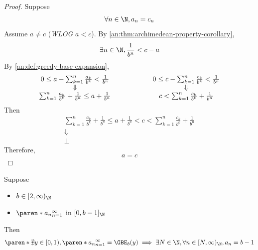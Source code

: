 \begin{proof}
  Suppose
  \[
    \forall n \in \N, a_{n} = c_{n}
  \]
  Assume $a \neq c$ (\emph{WLOG} $a < c$). By \cref{an:thm:archimedean-property-corollary},
  \[
    \exists n \in \N, \frac{1}{b^{n}} < c - a
  \]
  By \cref{an:def:greedy-base-expansion},
  \[
    \begin{array}{c@{\qquad\qquad\qquad}c}
      0 \leq a - \sum_{k = 1}^{n} \frac{a_{k}}{b^{k}} < \frac{1}{b^{n}}
       & 0 \leq c - \sum_{k = 1}^{n} \frac{c_{k}}{b^{k}} < \frac{1}{b^{n}} \\
      \Downarrow
       & \Downarrow                                                        \\
      \sum_{k = 1}^{n} \frac{a_{k}}{b^{k}} + \frac{1}{b^{n}} \leq a + \frac{1}{b^{n}}
       & c < \sum_{k = 1}^{n} \frac{c_{k}}{b^{k}} + \frac{1}{b^{n}}
    \end{array}
  \]
  Then
  \[
    \begin{array}{c}
      \sum_{k = 1}^{n} \frac{a_{k}}{b^{k}} + \frac{1}{b^{n}} \leq a + \frac{1}{b^{n}}
      < c < \sum_{k = 1}^{n} \frac{c_{k}}{b^{k}} + \frac{1}{b^{n}} \\
      \Downarrow                                                   \\
      \bot
    \end{array}
  \]
  Therefore,
  \[
    a = c
  \]
\end{proof}

\bigskip

\begin{theorem} \label{an:thm:no-real-number-matching-greedy-base-expansion}
  Suppose
  \begin{itemize}
    \item $b \in [2, \infty)_{\N}$
    \item $\paren*{a_{n}}_{n = 1}^{\infty}$ in $[0, b - 1]_{\N}$
  \end{itemize}
  Then
  \[
    \paren*{\nexists y \in [0, 1), \paren*{a_{n}}_{n = 1}^{\infty} = \GBE_{b}(y)}
    \implies \exists N \in \N, \forall n \in [N, \infty)_{\N}, a_{n} = b - 1
  \]
\end{theorem}
